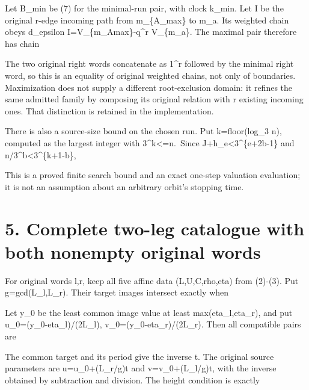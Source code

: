Let B\_min be (7) for the minimal-run pair, with clock k\_min. Let I be
the original r-edge incoming path from m\_\{A\_max\} to m\_a. Its
weighted chain obeys d\_epsilon I=V\_\{m\_Amax\}-q\^{}r V\_\{m\_a\}. The
maximal pair therefore has chain


The two original right words concatenate as 1\^{}r followed by the
minimal right word, so this is an equality of original weighted chains,
not only of boundaries. Maximization does not supply a different
root-exclusion domain: it refines the same admitted family by composing
its original relation with r existing incoming ones. That distinction is
retained in the implementation.

There is also a source-size bound on the chosen run. Put k=floor(log\_3
n), computed as the largest integer with 3\^{}k\textless=n.~Since
J+h\_e\textless3\^{}\{e+2b-1\} and n/3\^{}b\textless3\^{}\{k+1-b\},


This is a proved finite search bound and an exact one-step valuation
evaluation; it is not an assumption about an arbitrary orbit's stopping
time.

\section{5. Complete two-leg catalogue with both nonempty original
words}

For original words l,r, keep all five affine data (L,U,C,rho,eta) from
(2)-(3). Put g=gcd(L\_l,L\_r). Their target images intersect exactly
when


Let y\_0 be the least common image value at least max(eta\_l,eta\_r),
and put u\_0=(y\_0-eta\_l)/(2L\_l), v\_0=(y\_0-eta\_r)/(2L\_r). Then all
compatible pairs are


The common target and its period give the inverse t. The original source
parameters are u=u\_0+(L\_r/g)t and v=v\_0+(L\_l/g)t, with the inverse
obtained by subtraction and division. The height condition is exactly

